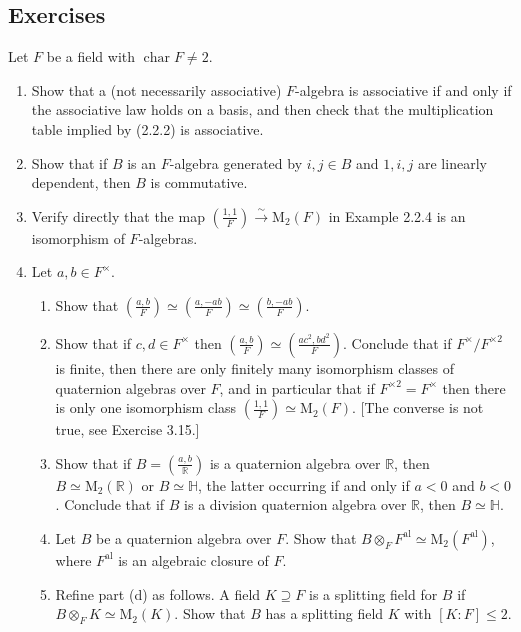 \documentclass{article}
\theoremstyle{definition}
\begin{document}
\subsection*{Exercises}

Let $F$ be a field with $\operatorname{char} F \neq 2$.

\begin{enumerate}
\item Show that a (not necessarily associative) $F$-algebra is associative if and only if the associative law holds on a basis, and then check that the multiplication table implied by (2.2.2) is associative.

\item Show that if $B$ is an $F$-algebra generated by $i, j \in B$ and $1, i, j$ are linearly dependent, then $B$ is commutative.

\item Verify directly that the map $\left(\frac{1,1}{F}\right) \xrightarrow{\sim} \mathrm{M}_2(F)$ in Example 2.2.4 is an isomorphism of $F$-algebras.

\item Let $a, b \in F^\times$.
\begin{enumerate}[label=(\alph*)]
\item Show that $\left(\frac{a, b}{F}\right) \simeq \left(\frac{a, -ab}{F}\right) \simeq \left(\frac{b, -ab}{F}\right)$.
\item Show that if $c, d \in F^\times$ then $\left(\frac{a, b}{F}\right) \simeq \left(\frac{ac^2, bd^2}{F}\right)$. Conclude that if $F^\times / F^{\times 2}$ is finite, then there are only finitely many isomorphism classes of quaternion algebras over $F$, and in particular that if $F^{\times 2} = F^\times$ then there is only one isomorphism class $\left(\frac{1,1}{F}\right) \simeq \mathrm{M}_2(F)$. [The converse is not true, see Exercise 3.15.]
\item Show that if $B = \left(\frac{a, b}{\mathbb{R}}\right)$ is a quaternion algebra over $\mathbb{R}$, then $B \simeq \mathrm{M}_2(\mathbb{R})$ or $B \simeq \mathbb{H}$, the latter occurring if and only if $a < 0$ and $b < 0$. Conclude that if $B$ is a division quaternion algebra over $\mathbb{R}$, then $B \simeq \mathbb{H}$.
\item Let $B$ be a quaternion algebra over $F$. Show that $B \otimes_F F^{\mathrm{al}} \simeq \mathrm{M}_2(F^{\mathrm{al}})$, where $F^{\mathrm{al}}$ is an algebraic closure of $F$.
\item Refine part (d) as follows. A field $K \supseteq F$ is a splitting field for $B$ if $B \otimes_F K \simeq \mathrm{M}_2(K)$. Show that $B$ has a splitting field $K$ with $[K : F] \leq 2$.
\end{enumerate}


\end{enumerate}
\end{document}
